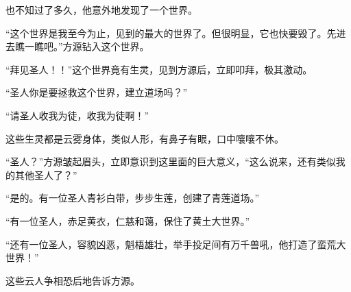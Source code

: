 \begin{this_body}
也不知过了多久，他意外地发现了一个世界。

“这个世界是我至今为止，见到的最大的世界了。但很明显，它也快要毁了。先进去瞧一瞧吧。”方源钻入这个世界。

“拜见圣人！！”这个世界竟有生灵，见到方源后，立即叩拜，极其激动。

“圣人你是要拯救这个世界，建立道场吗？”

“请圣人收我为徒，收我为徒啊！”

这些生灵都是云雾身体，类似人形，有鼻子有眼，口中嚷嚷不休。

“圣人？”方源皱起眉头，立即意识到这里面的巨大意义，“这么说来，还有类似我的其他圣人了？”

“是的。有一位圣人青衫白带，步步生莲，创建了青莲道场。”

“有一位圣人，赤足黄衣，仁慈和蔼，保住了黄土大世界。”

“还有一位圣人，容貌凶恶，魁梧雄壮，举手投足间有万千兽吼，他打造了蛮荒大世界！”

这些云人争相恐后地告诉方源。

\end{this_body}

